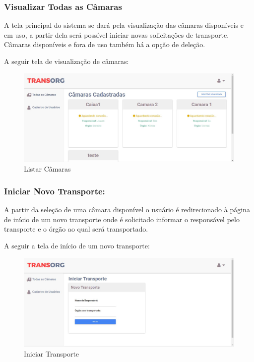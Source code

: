 \subsubsection{Visualizar Todas as Câmaras}
	A tela principal do sistema se dará pela visualização das câmaras disponíveis e em uso, a partir dela será possível iniciar novas solicitações de transporte. Câmaras disponíveis e fora de uso também há a opção de deleção.
	
	A seguir tela de visualização de câmaras:

\begin{figure}[H]
\centering
\includegraphics[width=16cm]{figuras/listaCamaras_software.jpg}
\caption{Listar Câmaras}
\end{figure}

\subsubsection{Iniciar Novo Transporte:}
	A partir da seleção de uma câmara disponível o usuário é redirecionado à página de início de um novo transporte onde é solicitado informar o responsável pelo transporte e o órgão ao qual será transportado.
	
	A seguir a tela de início de um novo transporte:

\begin{figure}[H]
\centering
\includegraphics[width=16cm]{figuras/iniciarTransporte_software.jpg}
\caption{Iniciar Transporte}
\end{figure}

